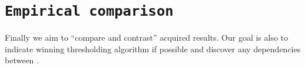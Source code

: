 \documentclass[12pt,a4paper,twocolumn]{article}
\begin{document}
\section*{\texttt{Empirical comparison}}
Finally we aim to ``compare and contrast'' acquired results. Our goal is also to indicate winning thresholding algorithm if possible and discover any dependencies between .

\end{document}
